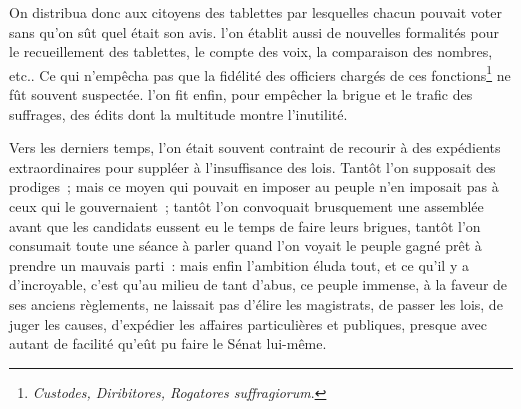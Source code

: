 \documentclass[french,twoside]{book} %
\begin{document}
On distribua donc aux citoyens des tablettes par lesquelles chacun pouvait voter sans qu’on sût quel était son avis. l’on établit aussi de nouvelles formalités pour le recueillement des tablettes, le compte des voix, la comparaison des nombres, etc.. Ce qui n’empêcha pas que la fidélité des officiers chargés de ces fonctions\footnote{{\itshape Custodes, Diribitores, Rogatores suffragiorum}.} ne fût souvent suspectée. l’on fit enfin, pour empêcher la brigue et le trafic des suffrages, des édits dont la multitude montre l’inutilité.\par
Vers les derniers temps, l’on était souvent contraint de recourir à des expédients extraordinaires pour suppléer à l’insuffisance des lois. Tantôt l’on supposait des prodiges ; mais ce moyen qui pouvait en imposer au peuple n’en imposait pas à ceux qui le gouvernaient ; tantôt l’on convoquait brusquement une assemblée avant que les candidats eussent eu le temps de faire leurs brigues, tantôt l’on consumait toute une séance à parler quand l’on voyait le peuple gagné prêt à prendre un mauvais parti : mais enfin l’ambition éluda tout, et ce qu’il y a d’incroyable, c’est qu’au milieu de tant d’abus, ce peuple immense, à la faveur de ses anciens règlements, ne laissait pas d’élire les magistrats, de passer les lois, de juger les causes, d’expédier les affaires particulières et publiques, presque avec autant de facilité qu’eût pu faire le Sénat lui-même.
\end{document}

